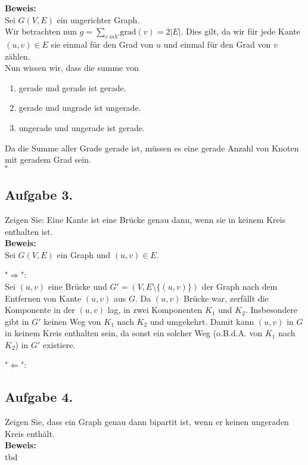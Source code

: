 \documentclass[11pt,a4paper,ngerman]{article}
\begin{document}
\textbf{Beweis:}\\

Sei $G(V,E)$ ein ungerichter Graph.\\

Wir betrachten nun $g = \underset{v\ in V}{\sum} \text{grad}(v) = 2 |E|$.
Dies gilt, da wir für jede Kante $(u,v) \in E$ sie einmal für den Grad von $u$ und einmal
für den Grad von $v$ zählen.\\

Nun wissen wir, dass die summe von
\begin{enumerate}
	\item gerade und gerade ist gerade.
	\item gerade und ungrade ist ungerade.
	\item ungerade und ungerade ist gerade.
\end{enumerate}
Da die Summe aller Grade gerade ist, müssen es eine gerade Anzahl von Knoten mit geradem Grad sein.\\

\mbox{}\hfill$\square$

\subsection*{Aufgabe 3.}

Zeigen Sie: Eine Kante ist eine Brücke genau dann, wenn sie in keinem Kreis enthalten ist.\\

\textbf{Beweis:}\\
Sei $G(V,E)$ ein Graph und $(u,v) \in E$.

"$\Rightarrow$":\\
Sei $(u,v)$ eine Brücke und $G' = (V,E \setminus \{ (u,v) \})$ der Graph nach dem Entfernen von Kante $(u,v)$ aus $G$.
Da $(u,v)$ Brücke war, zerfällt die Komponente in der $(u,v)$ lag, in zwei Komponenten $K_1$ und $K_2$.
Insbesondere gibt in $G'$ keinen Weg von $K_1$ nach $K_2$ und umgekehrt. Damit kann $(u,v)$ in $G$ in
keinem Kreis enthalten sein, da sonst ein solcher Weg (o.B.d.A. von $K_1$ nach $K_2$) in $G'$ existiere.

"$\Leftarrow$":\\

\subsection*{Aufgabe 4.}

Zeigen Sie, dass ein Graph genau dann bipartit ist, wenn er keinen ungeraden Kreis enthält.\\

\textbf{Beweis:}\\

tbd

\label{LastPage}
\end{document}
